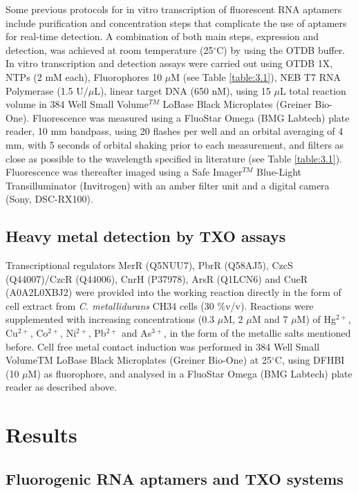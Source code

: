 Some previous protocols for in vitro transcription of fluorescent RNA aptamers \citep{paige2011rna, autour2016ispinach} include purification and concentration steps that complicate the use of aptamers for real-time detection. A combination of both main steps, expression and detection, was achieved at room temperature (25$^{\circ}$C) by using the OTDB buffer. In vitro transcription and detection assays were carried out using OTDB 1X, NTPs (2 mM each), Fluorophores 10 $\mu$M (see Table \ref{table:3.1}), NEB T7 RNA Polymerase (1.5 U/$\mu$L), linear target DNA (650 nM), using 15 $\mu$L total reaction volume in 384 Well Small Volume$^{TM}$ LoBase Black Microplates (Greiner Bio-One). Fluorescence was measured using a FluoStar Omega (BMG Labtech) plate reader, 10 mm bandpass, using 20 flashes per well and an orbital averaging of 4 mm, with 5 seconds of orbital shaking prior to each measurement, and filters as close as possible to the wavelength specified in literature (see Table \ref{table:3.1}). Fluorescence was thereafter imaged using a Safe Imager$^{TM}$ Blue-Light Transilluminator (Invitrogen) with an amber filter unit and a digital camera (Sony, DSC-RX100).

\subsection*{Heavy metal detection by TXO assays}

Transcriptional regulators MerR (Q5NUU7), PbrR (Q58AJ5), CzcS (Q44007)/CzcR (Q44006), CnrH (P37978), ArsR (Q1LCN6) and CueR (A0A2L0XBJ2) were provided into the working reaction directly in the form of cell extract from \textit{C. metallidurans} CH34 cells (30 \%v/v). Reactions were supplemented with increasing concentrations (0.3 $\mu$M, 2 $\mu$M and 7 $\mu$M) of Hg$^{2+}$, Cu$^{2+}$, Co$^{2+}$, Ni$^{2+}$, Pb$^{2+}$ and As$^{3+}$, in the form of the metallic salts mentioned before. Cell free metal contact induction was performed in 384 Well Small VolumeTM LoBase Black Microplates (Greiner Bio-One) at 25$^{\circ}$C, using DFHBI (10 $\mu$M) as fluorophore, and analysed in a FluoStar Omega (BMG Labtech) plate reader as described above.


\section{Results}

\subsection*{Fluorogenic RNA aptamers and TXO systems}


